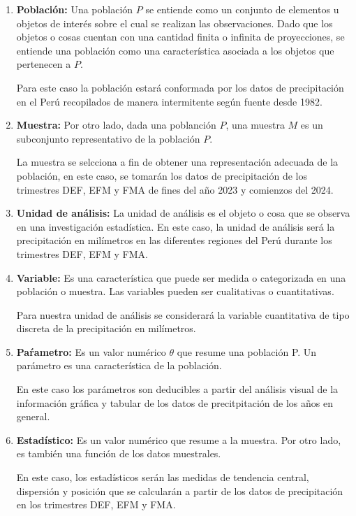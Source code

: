 \documentclass{article}
\begin{document}
\begin{enumerate}
  \item \textbf{Población:} Una población $P$ se entiende como un conjunto de elementos u objetos de interés sobre el cual se realizan las observaciones. Dado que los objetos o cosas cuentan con una cantidad finita o infinita de proyecciones, se entiende una población como una característica asociada a los objetos que pertenecen a $P$.
  
  Para este caso la población estará conformada por los datos de precipitación en el Perú recopilados de manera intermitente según fuente desde 1982.

  \item \textbf{Muestra:} Por otro lado, dada una poblanción $P$, una muestra $M$ es un subconjunto representativo de la población $P$.
  
  La muestra se selcciona a fin de obtener una representación adecuada de la población, en este caso, se tomarán los datos de precipitación de los trimestres DEF, EFM y FMA de fines del año 2023 y comienzos del 2024.

  \item \textbf{Unidad de análisis:} La unidad de análisis es el objeto o cosa que se observa en una investigación estadística. En este caso, la unidad de análisis será la precipitación en milímetros en las diferentes regiones del Perú durante los trimestres DEF, EFM y FMA.
  
  \item \textbf{Variable:} Es una característica que puede ser medida o categorizada en una población o muestra. Las variables pueden ser cualitativas o cuantitativas.
  
  Para nuestra unidad de análisis se considerará la variable cuantitativa de tipo discreta de la precipitación en milímetros.

  \item \textbf{Paŕametro:} Es un valor numérico $\theta$ que resume una población P. Un parámetro es una característica de la población.
  
  En este caso los parámetros son deducibles a partir del análisis visual de la información gráfica y tabular de los datos de precitpitación de los años en general.

  \item \textbf{Estadístico:} Es un valor numérico que resume a la muestra. Por otro lado, es también una función de los datos muestrales.
  
  En este caso, los estadísticos serán las medidas de tendencia central, dispersión y posición que se calcularán a partir de los datos de precipitación en los trimestres DEF, EFM y FMA.
\end{enumerate}
\end{document}
